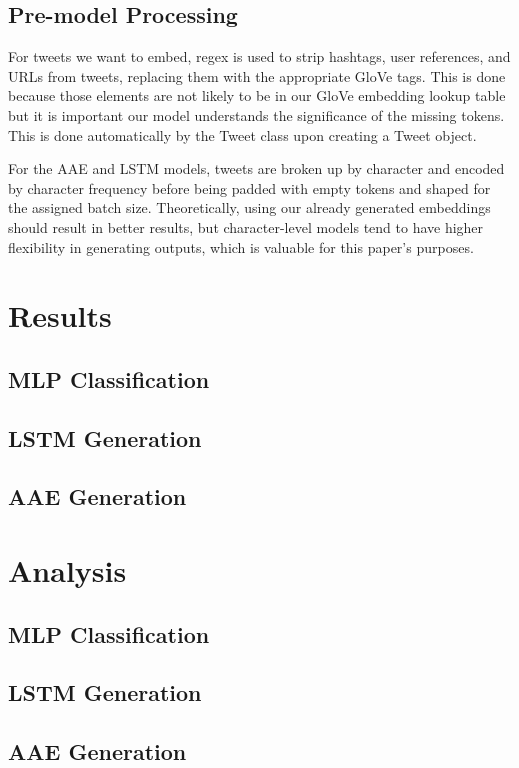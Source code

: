 \documentclass{article}
\begin{document}
	\subsection{Pre-model Processing}
		For tweets we want to embed, regex is used to strip hashtags, user references,
		and URLs from tweets, replacing them with the appropriate GloVe tags. This is done
		because those elements are not likely to be in our GloVe embedding lookup table
		but it is important our model understands the significance of the missing tokens.
		This is done automatically by the Tweet class upon creating a Tweet object.

		For the AAE and LSTM models, tweets are broken up by character and encoded by character
		frequency before being padded with empty tokens and shaped for the assigned batch
		size. Theoretically, using our already generated embeddings should result in
		better results, but character-level models tend to have higher flexibility in
		generating outputs, which is valuable for this paper's purposes.

\section{Results}
	\subsection{MLP Classification}
	\subsection{LSTM Generation}
	\subsection{AAE Generation}

\section{Analysis}
	\subsection{MLP Classification}
	\subsection{LSTM Generation}
	\subsection{AAE Generation}

\printbibliography
\end{document}
